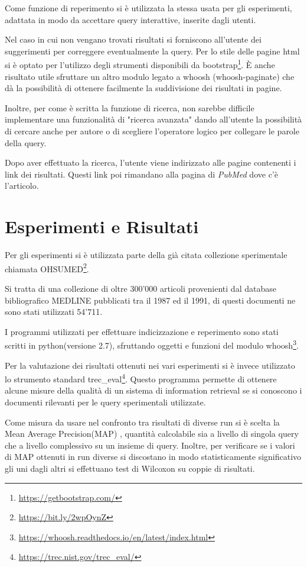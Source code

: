\documentclass[runningheads]{llncs}
\begin{document}
Come funzione di reperimento si \`e utilizzata la stessa usata per gli esperimenti,
adattata in modo da accettare query interattive, inserite dagli utenti.

Nel caso in cui non vengano trovati risultati si forniscono all'utente dei
suggerimenti per correggere eventualmente la query.
Per lo stile delle pagine html si \`e optato per l'utilizzo degli strumenti
disponibili da bootstrap\footnote{\url{https://getbootstrap.com/}}.
\`E anche risultato utile sfruttare un altro modulo legato a whoosh (whoosh-paginate)
che d\`a la possibilit\`a di ottenere facilmente la suddivisione dei risultati in pagine.

Inoltre, per come \`e scritta la funzione di ricerca, non sarebbe difficile
implementare una funzionalit\`a di "ricerca avanzata" dando all'utente la possibilit\`a
di cercare anche per autore o di scegliere l'operatore logico per collegare le parole
della query.

Dopo aver effettuato la ricerca, l'utente viene indirizzato alle pagine contenenti
i link dei risultati.
Questi link poi rimandano alla pagina di \emph{PubMed} dove c'\`e l'articolo.

\section{Esperimenti e Risultati}
\label{sec:esperimenti}


Per gli esperimenti si \`e utilizzata parte della gi\`a citata collezione sperimentale chiamata OHSUMED\footnote{ \url{https://bit.ly/2wpOynZ}}.

Si tratta di una collezione di oltre 300'000 articoli provenienti dal database bibliografico MEDLINE pubblicati tra il 1987 ed il 1991, di questi documenti ne sono stati utilizzati 54'711.

I programmi utilizzati per effettuare indicizzazione e reperimento sono stati scritti in python(versione 2.7), sfruttando oggetti e funzioni del modulo whoosh\footnote{ \url{https://whoosh.readthedocs.io/en/latest/index.html}}.

Per la valutazione dei risultati ottenuti nei vari esperimenti si \`e invece utilizzato lo strumento standard trec\_eval\footnote{ \url{https://trec.nist.gov/trec\_eval/}}.
Questo programma permette di ottenere alcune misure della qualit\`a di un sistema di information retrieval se si conoscono i documenti rilevanti per le query sperimentali utilizzate.

Come misura da usare nel confronto tra risultati di diverse run si \`e scelta la Mean Average Precision(MAP)\cite{WBC_map} , quantit\`a calcolabile sia a livello di singola query che a livello complessivo su un insieme di query.
Inoltre, per verificare se i valori di MAP ottenuti in run diverse si discostano in modo statisticamente significativo gli uni dagli altri si effettuano test di Wilcoxon\cite{} su coppie di risultati. \par
\end{document}
